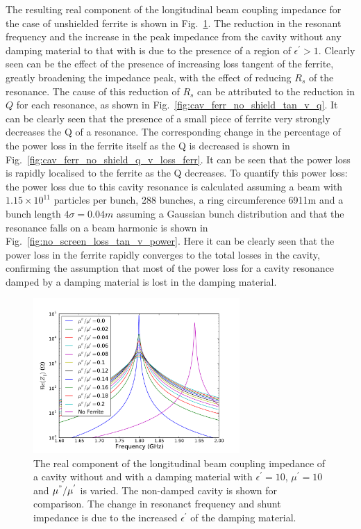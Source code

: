 The resulting real component of the longitudinal beam coupling impedance for the case of unshielded ferrite is shown in Fig.~\ref{fig:no_screen_long_imp}. The reduction in the resonant frequency and the increase in the peak impedance from the cavity without any damping material to that with is due to the presence of a region of $\epsilon^{'}>1$. Clearly seen can be the effect of the presence of increasing loss tangent of the ferrite, greatly broadening the impedance peak, with the effect of reducing $R_{s}$ of the resonance. The cause of this reduction of $R_{s}$ can be attributed to the reduction in $Q$ for each resonance, as shown in Fig.~\ref{fig:cav_ferr_no_shield_tan_v_q}. It can be clearly seen that the presence of a small piece of ferrite very strongly decreases the Q of a resonance. The corresponding change in the percentage of the power loss in the ferrite itself as the Q is decreased is shown in Fig.~\ref{fig:cav_ferr_no_shield_q_v_loss_ferr}. It can be seen that the power loss is rapidly localised to the ferrite as the Q decreases. To quantify this power loss: the power loss due to this cavity resonance is calculated assuming a beam with $1.15 \times 10^{11}$ particles per bunch, 288 bunches, a ring circumference 6911m and a bunch length $4\sigma = 0.04m$ assuming a Gaussian bunch distribution and that the resonance falls on a beam harmonic is shown in Fig.~\ref{fig:no_screen_loss_tan_v_power}. Here it can be clearly seen that the power loss in the ferrite rapidly converges to the total losses in the cavity, confirming the assumption that most of the power loss for a cavity resonance damped by a damping material is lost in the damping material. 

\begin{figure}
\begin{center}
\includegraphics[width=0.7\textwidth]{Beam_Coupling_Impedance_Reduction_Techniques/figures/no_screen_long_imp_all.pdf}
\end{center}
\caption{The real component of the longitudinal beam coupling impedance of a cavity without and with a damping material with $\epsilon^{'}=10$, $\mu^{'}=10$ and $\mu^{"}/\mu^{'}$ is varied. The non-damped cavity is shown for comparison. The change in resonanct frequency and shunt impedance is due to the increased $\epsilon^{'}$ of the damping material.}
\label{fig:no_screen_long_imp}
\end{figure}

